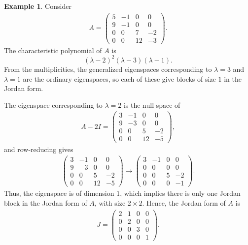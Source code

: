 \documentclass[10pt]{book}
\theoremstyle{definition}
\newtheorem{example}{Example}[chapter]
\numberwithin{equation}{chapter}
\begin{document}
\medskip

\begin{example}
Consider 
\begin{align*}
    A = \begin{pmatrix}
    5 & -1 & 0 & 0 \\
    9 & -1 & 0 & 0 \\
    0 & 0 & 7 & -2 \\
    0 & 0 & 12 & -3
    \end{pmatrix}.
\end{align*}
The characteristic polynomial of $A$ is 
$$(\lambda - 2)^2(\lambda - 3)(\lambda - 1).$$
From the multiplicities, the generalized eigenspaces corresponding to $\lambda = 3$ and $\lambda = 1$ are the ordinary eigenspaces, so each of these give blocks of size $1$ in the Jordan form.

The eigenspace corresponding to $\lambda = 2$ is the null space of 
\begin{align*}
    A - 2I = \begin{pmatrix}
    3 & -1 & 0 & 0 \\
    9 & -3 & 0 & 0 \\
    0 & 0 & 5 & -2 \\
    0 & 0 & 12 & -5
    \end{pmatrix},
\end{align*}
and row-reducing gives
\begin{align*}
    \begin{pmatrix}
    3 & -1 & 0 & 0 \\
    9 & -3 & 0 & 0 \\
    0 & 0 & 5 & -2 \\
    0 & 0 & 12 & -5
    \end{pmatrix} \to
    \begin{pmatrix}
    3 & -1 & 0 & 0 \\
    0 & 0 & 0 & 0 \\
    0 & 0 & 5 & -2 \\
    0 & 0 & 0 & -1
    \end{pmatrix}.
\end{align*}
Thus, the eigenspace is of dimension $1$, which implies there is only one Jordan block in the Jordan form of $A$, with size $2\times 2$. Hence, the Jordan form of $A$ is
\begin{align*}
    J = \begin{pmatrix}
    2 & 1 & 0 & 0 \\
    0 & 2 & 0 & 0 \\
    0 & 0 & 3 & 0 \\
    0 & 0 & 0 & 1
    \end{pmatrix}.
\end{align*}


\end{example}
\end{document}
